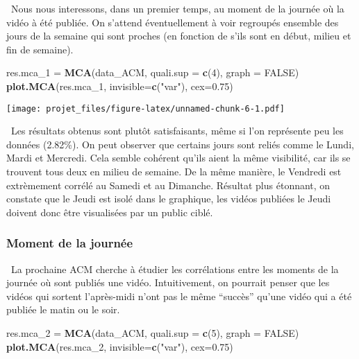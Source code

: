 \documentclass[
]{article}
\newenvironment{Shaded}{\begin{snugshade}}{\end{snugshade}}
\newcommand{\DataTypeTok}[1]{\textcolor[rgb]{0.13,0.29,0.53}{#1}}
\newcommand{\DecValTok}[1]{\textcolor[rgb]{0.00,0.00,0.81}{#1}}
\newcommand{\FloatTok}[1]{\textcolor[rgb]{0.00,0.00,0.81}{#1}}
\newcommand{\KeywordTok}[1]{\textcolor[rgb]{0.13,0.29,0.53}{\textbf{#1}}}
\newcommand{\NormalTok}[1]{#1}
\newcommand{\OtherTok}[1]{\textcolor[rgb]{0.56,0.35,0.01}{#1}}
\newcommand{\StringTok}[1]{\textcolor[rgb]{0.31,0.60,0.02}{#1}}
\begin{document}
 Nous nous interessons, dans un premier temps, au moment de la journée
où la vidéo à été publiée. On s'attend éventuellement à voir regroupés
ensemble des jours de la semaine qui sont proches (en fonction de s'ils
sont en début, milieu et fin de semaine).

\begin{Shaded}
\begin{Highlighting}[]
\NormalTok{res.mca_}\DecValTok{1}\NormalTok{ =}\StringTok{ }\KeywordTok{MCA}\NormalTok{(data_ACM, }\DataTypeTok{quali.sup =} \KeywordTok{c}\NormalTok{(}\DecValTok{4}\NormalTok{), }\DataTypeTok{graph =} \OtherTok{FALSE}\NormalTok{)}
\KeywordTok{plot.MCA}\NormalTok{(res.mca_}\DecValTok{1}\NormalTok{, }\DataTypeTok{invisible=}\KeywordTok{c}\NormalTok{(}\StringTok{"var"}\NormalTok{), }\DataTypeTok{cex=}\FloatTok{0.75}\NormalTok{)}
\end{Highlighting}
\end{Shaded}

\texttt{[image: projet\_files/figure-latex/unnamed-chunk-6-1.pdf]}

 Les résultats obtenus sont plutôt satisfaisants, même si l'on
représente peu les données (2.82\%). On peut observer que certains jours
sont reliés comme le Lundi, Mardi et Mercredi. Cela semble cohérent
qu'ils aient la même visibilité, car ils se trouvent tous deux en milieu
de semaine. De la même manière, le Vendredi est extrèmement corrélé au
Samedi et au Dimanche. Résultat plus étonnant, on constate que le Jeudi
est isolé dans le graphique, les vidéos publiées le Jeudi doivent donc
être visualisées par un public ciblé.

\hypertarget{moment-de-la-journuxe9e}{%
\subsubsection{Moment de la journée}\label{moment-de-la-journuxe9e}}

 La prochaine ACM cherche à étudier les corrélations entre les moments
de la journée où sont publiés une vidéo. Intuitivement, on pourrait
penser que les vidéos qui sortent l'après-midi n'ont pas le même
``succès'' qu'une vidéo qui a été publiée le matin ou le soir.

\begin{Shaded}
\begin{Highlighting}[]
\NormalTok{res.mca_}\DecValTok{2}\NormalTok{ =}\StringTok{ }\KeywordTok{MCA}\NormalTok{(data_ACM, }\DataTypeTok{quali.sup =} \KeywordTok{c}\NormalTok{(}\DecValTok{5}\NormalTok{), }\DataTypeTok{graph =} \OtherTok{FALSE}\NormalTok{)}
\KeywordTok{plot.MCA}\NormalTok{(res.mca_}\DecValTok{2}\NormalTok{, }\DataTypeTok{invisible=}\KeywordTok{c}\NormalTok{(}\StringTok{"var"}\NormalTok{), }\DataTypeTok{cex=}\FloatTok{0.75}\NormalTok{)}
\end{Highlighting}
\end{Shaded}
\end{document}
